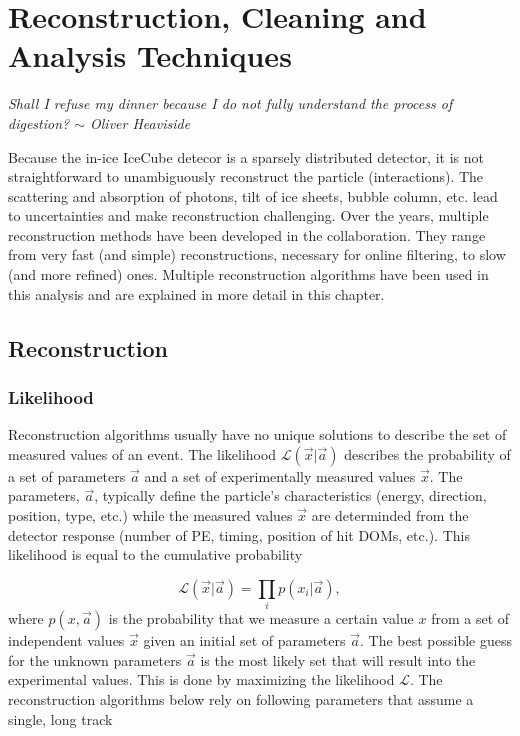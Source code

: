 \chapter{Reconstruction, Cleaning and Analysis Techniques}
\label{ch:reconstruction}
\begin{flushright}
\textit{Shall I refuse my dinner because I do not fully understand the process of digestion? $\sim$ Oliver Heaviside}
\end{flushright}
Because the in-ice IceCube detecor is a sparsely distributed detector, it is not straightforward to unambiguously reconstruct the particle (interactions). The scattering and absorption of photons, tilt of ice sheets, bubble column, etc. lead to uncertainties and make reconstruction challenging. Over the years, multiple reconstruction methods have been developed in the collaboration. They range from very fast (and simple) reconstructions, necessary for online filtering, to slow (and more refined) ones. Multiple reconstruction algorithms have been used in this analysis and are explained in more detail in this chapter.



\section{Reconstruction}

\subsection{Likelihood}
Reconstruction algorithms usually have no unique solutions to describe the set of measured values of an event. The likelihood $\mathcal{L}(\vec{x} |\vec{a})$ describes the probability of a set of parameters ${\vec{a}}$ and a set of experimentally measured values ${\vec{x}}$. The parameters, ${\vec{a}}$, typically define the particle's characteristics (energy, direction, position, type, etc.) while the measured values ${\vec{x}}$ are determinded from the detector response (number of PE, timing, position of hit DOMs, etc.). This likelihood is equal to the cumulative probability

\begin{equation}
\mathcal{L}(\vec{x}|\vec{a}) = \prod_i p(x_i|\vec{a}),
\end{equation}
\noindent where $p(x,\vec{a})$ is the probability that we measure a certain value $x$ from a set of independent values $\vec{x}$ given an initial set of parameters $\vec{a}$. The best possible guess for the unknown parameters $\vec{a}$ is the most likely set that will result into the experimental values. This is done by maximizing the likelihood $\mathcal{L}$. The reconstruction algorithms below rely on following parameters that assume a single, long track

